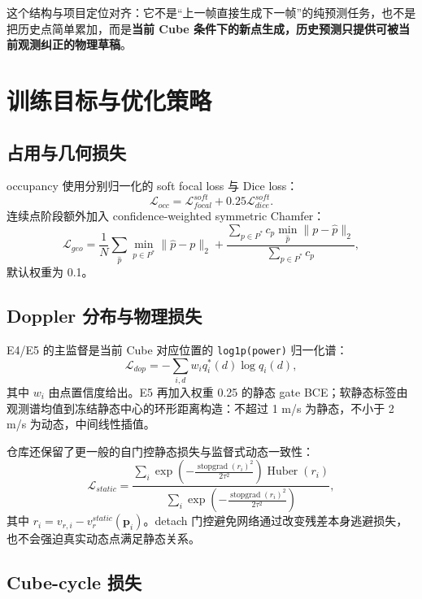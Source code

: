 \documentclass[11pt,a4paper,fontset=none]{ctexart}
\newcommand{\code}[1]{\texttt{#1}}
\begin{document}
这个结构与项目定位对齐：它不是“上一帧直接生成下一帧”的纯预测任务，也不是把历史点简单累加，而是\textbf{当前 Cube 条件下的新点生成，历史预测只提供可被当前观测纠正的物理草稿}。

\section{训练目标与优化策略}

\subsection{占用与几何损失}

occupancy 使用分别归一化的 soft focal loss 与 Dice loss：
\begin{equation}
  \mathcal L_{occ}=\mathcal L_{focal}^{soft}+0.25\mathcal L_{dice}^{soft}.
\end{equation}
连续点阶段额外加入 confidence-weighted symmetric Chamfer：
\begin{equation}
  \mathcal L_{geo}=\frac{1}{N}\sum_{\hat p}\min_{p\in P^*}\|\hat p-p\|_2
  +\frac{\sum_{p\in P^*}c_p\min_{\hat p}\|p-\hat p\|_2}{\sum_{p\in P^*}c_p},
\end{equation}
默认权重为 0.1。

\subsection{Doppler 分布与物理损失}

E4/E5 的主监督是当前 Cube 对应位置的 \code{log1p(power)} 归一化谱：
\begin{equation}
  \mathcal L_{dop}= -\sum_{i,d}w_i q_i^*(d)\log q_i(d),
\end{equation}
其中 $w_i$ 由点置信度给出。E5 再加入权重 0.25 的静态 gate BCE；软静态标签由观测谱均值到冻结静态中心的环形距离构造：不超过 1 m/s 为静态，不小于 2 m/s 为动态，中间线性插值。

仓库还保留了更一般的自门控静态损失与监督式动态一致性：
\begin{equation}
  \mathcal L_{static}=\frac{\sum_i
  \exp\!\left(-\frac{\operatorname{stopgrad}(r_i)^2}{2\tau^2}\right)
  \operatorname{Huber}(r_i)}{\sum_i
  \exp\!\left(-\frac{\operatorname{stopgrad}(r_i)^2}{2\tau^2}\right)},
\end{equation}
其中 $r_i=v_{r,i}-v^{static}_r(\mathbf p_i)$。detach 门控避免网络通过改变残差本身逃避损失，也不会强迫真实动态点满足静态关系。

\subsection{Cube-cycle 损失}
\end{document}
